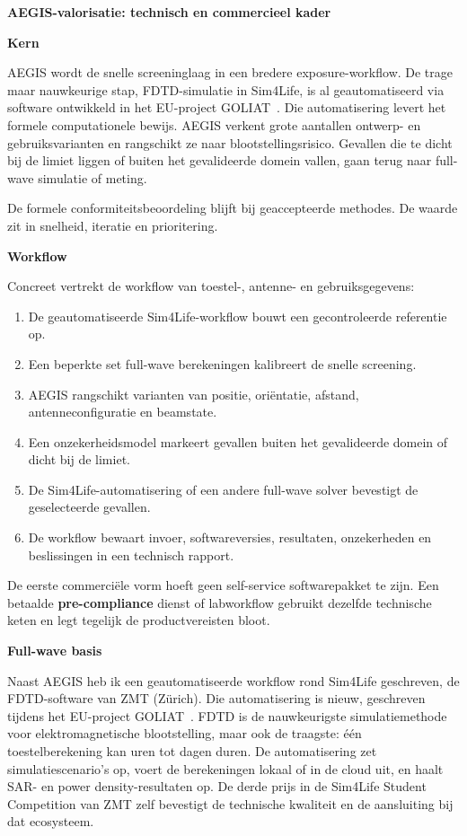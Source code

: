\documentclass[10pt,a4paper]{article}
\begin{document}
{\Large\bfseries AEGIS-valorisatie: technisch en commercieel kader}

\vspace{8pt}

\textbf{Kern}

AEGIS wordt de snelle screeninglaag in een bredere exposure-workflow. De trage maar nauwkeurige stap, FDTD-simulatie in Sim4Life, is al geautomatiseerd via software ontwikkeld in het EU-project GOLIAT~\cite{goliat_docs}. Die automatisering levert het formele computationele bewijs. AEGIS verkent grote aantallen ontwerp- en gebruiksvarianten en rangschikt ze naar blootstellingsrisico. Gevallen die te dicht bij de limiet liggen of buiten het gevalideerde domein vallen, gaan terug naar full-wave simulatie of meting.

De formele conformiteitsbeoordeling blijft bij geaccepteerde methodes. De waarde zit in snelheid, iteratie en prioritering.

\textbf{Workflow}

Concreet vertrekt de workflow van toestel-, antenne- en gebruiksgegevens:

\begin{enumerate}
  \item De geautomatiseerde Sim4Life-workflow bouwt een gecontroleerde referentie op.
  \item Een beperkte set full-wave berekeningen kalibreert de snelle screening.
  \item AEGIS rangschikt varianten van positie, oriëntatie, afstand, antenneconfiguratie en beamstate.
  \item Een onzekerheidsmodel markeert gevallen buiten het gevalideerde domein of dicht bij de limiet.
  \item De Sim4Life-automatisering of een andere full-wave solver bevestigt de geselecteerde gevallen.
  \item De workflow bewaart invoer, softwareversies, resultaten, onzekerheden en beslissingen in een technisch rapport.
\end{enumerate}

De eerste commerciële vorm hoeft geen self-service softwarepakket te zijn. Een betaalde \textbf{pre-compliance} dienst of labworkflow gebruikt dezelfde technische keten en legt tegelijk de productvereisten bloot.

\textbf{Full-wave basis}

Naast AEGIS heb ik een geautomatiseerde workflow rond Sim4Life geschreven, de FDTD-software van ZMT (Zürich). Die automatisering is nieuw, geschreven tijdens het EU-project GOLIAT~\cite{goliat_docs}. FDTD is de nauwkeurigste simulatiemethode voor elektromagnetische blootstelling, maar ook de traagste: één toestelberekening kan uren tot dagen duren. De automatisering zet simulatiescenario's op, voert de berekeningen lokaal of in de cloud uit, en haalt SAR- en power density-resultaten op. De derde prijs in de Sim4Life Student Competition van ZMT zelf bevestigt de technische kwaliteit en de aansluiting bij dat ecosysteem.
\end{document}
